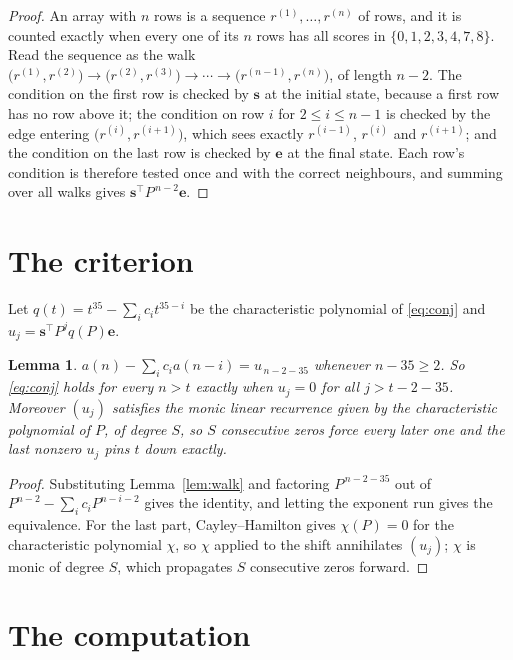 \documentclass[11pt,a4paper]{article}
\theoremstyle{plain}
\newtheorem{lemma}[theorem]{Lemma}
\theoremstyle{definition}
\begin{document}
\begin{proof}
An array with $n$ rows is a sequence $r^{(1)},\dots,r^{(n)}$ of rows, and it is counted
exactly when every one of its $n$ rows has all scores in $\{0,1,2,3,4,7,8\}$. Read the sequence as the
walk $\bigl(r^{(1)},r^{(2)}\bigr)\to\bigl(r^{(2)},r^{(3)}\bigr)\to\cdots\to
\bigl(r^{(n-1)},r^{(n)}\bigr)$, of length $n-2$. The condition on the first row is
checked by $\mathbf{s}$ at the initial state, because a first row has no row above it; the
condition on row $i$ for $2\le i\le n-1$ is checked by the edge entering
$\bigl(r^{(i)},r^{(i+1)}\bigr)$, which sees exactly $r^{(i-1)}$, $r^{(i)}$ and
$r^{(i+1)}$; and the condition on the last row is checked by $\mathbf{e}$ at the final
state. Each row's condition is therefore tested once and with the correct neighbours, and
summing over all walks gives $\mathbf{s}^{\!\top}P^{\,n-2}\mathbf{e}$.
\end{proof}

\section{The criterion}

Let $q(t)=t^{35}-\sum_i c_i t^{35-i}$ be the characteristic polynomial of
\eqref{eq:conj} and $u_j=\mathbf{s}^{\!\top}P^{j}q(P)\mathbf{e}$.

\begin{lemma}\label{lem:crit}
$a(n)-\sum_i c_i a(n-i)=u_{\,n-2-35}$ whenever $n-35\ge2$. So \eqref{eq:conj}
holds for every $n>t$ exactly when $u_j=0$ for all $j>t-2-35$. Moreover $(u_j)$
satisfies the monic linear recurrence given by the characteristic polynomial of $P$, of
degree $S$, so $S$ consecutive zeros force every later one and the last nonzero $u_j$ pins
$t$ down exactly.
\end{lemma}

\begin{proof}
Substituting Lemma~\ref{lem:walk} and factoring $P^{\,n-2-35}$ out of
$P^{n-2}-\sum_i c_i P^{n-i-2}$ gives the identity, and letting the exponent run gives the
equivalence. For the last part, Cayley--Hamilton gives $\chi(P)=0$ for the characteristic
polynomial $\chi$, so $\chi$ applied to the shift annihilates $(u_j)$; $\chi$ is monic of
degree $S$, which propagates $S$ consecutive zeros forward.
\end{proof}

\section{The computation}
\end{document}
